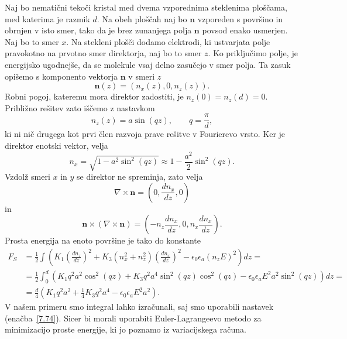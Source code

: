 Naj bo nematični tekoči kristal med dvema vzporednima
steklenima ploščama, med katerima je razmik $d$. Na obeh ploščah naj bo $\mathbf{n}$ vzporeden
s površino in obrnjen v isto smer, tako da je brez zunanjega 
polja $\mathbf{n}$ povsod enako usmerjen. Naj bo to smer $x$.
Na stekleni plošči dodamo elektrodi, ki ustvarjata polje pravokotno na 
prvotno smer direktorja, naj bo to smer $z$.
Ko priključimo polje, je energijsko ugodnejše, da
se molekule vsaj delno zasučejo v smer polja. Ta zasuk opišemo s
komponento vektorja $\mathbf{n}$ v smeri $z$
\begin{equation}
\mathbf{n}(z)=(n_{x}(z),0,n_{z}(z)).
\label{7.73}
\end{equation}
Robni pogoj, kateremu mora direktor zadostiti,
je $n_{z}(0)=n_{z}(d)=0$. Približno rešitev zato iščemo z nastavkom 
\begin{equation}
n_{z}(z)=a\sin (qz), \qquad q=\frac{\pi}{d},
\label{7.74}
\end{equation}
ki ni nič drugega kot prvi člen razvoja prave rešitve v Fourierevo vrsto.
Ker je direktor enotski vektor, velja
\begin{equation}
n_x = \sqrt{1-a^2\sin^2(qz)} \approx 1 - \frac{a^2}{2}\sin^2(qz).
\end{equation}
Vzdolž smeri $x$ in $y$ se direktor ne spreminja, zato velja
\begin{equation}
\nabla\times\mathbf{n}=(0,\frac{dn_{x}}{dz},0)
\label{7.75}
\end{equation}
 in 
\begin{equation}
\mathbf{n}\times(\nabla\times\mathbf{n})=(-n_{z}\frac{dn_{x}}{dz},0,
n_{x}\frac{dn_{x}}{dz}).
\label{7.76}
\end{equation}
Prosta energija na enoto površine je tako do konstante
\begin{align}
F_S & =  \frac{1}{2}\int\left(K_{1}\left(\frac{dn_{z}}{dz}\right)^{2}+K_{3}(n_x^2+n_{z}^{2})
\left(\frac{dn_{x}}{dz}\right)^{2}-
\epsilon_{0}\epsilon_{a}(n_{z}E)^{2}\right)dz=\nonumber \\
 & =  \frac{1}{2}\int_{0}^{d}
 \left(K_{1}q^{2}a^{2}\cos^{2}(qz)+K_{3}q^{2}a^{4}\sin^{2}(qz)\cos^2(qz)-
 \epsilon_{0}\epsilon_{a}E^2a^{2}\sin^{2}(qz)\right)dz=\nonumber \\
 & =  \frac{d}{4}\left( K_{1}q^{2}a^2+\frac{1}{4}K_{3}q^{2}a^4-\epsilon_{0}\epsilon_{a}E^2a^2\right).
\end{align}
V našem primeru smo integral lahko izračunali, saj smo uporabili nastavek (enačba~\ref{7.74}).
Sicer bi morali uporabiti Euler-Lagrangeevo metodo za minimizacijo proste energije, ki 
jo poznamo iz variacijskega računa.

